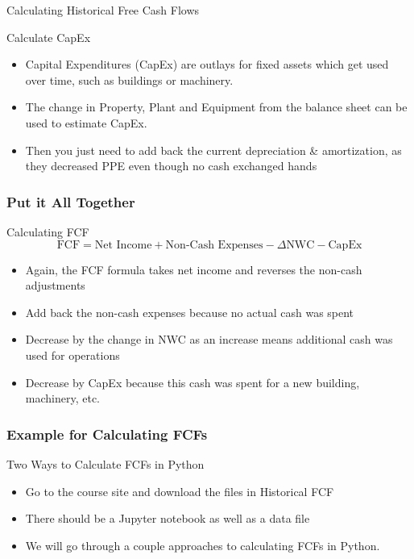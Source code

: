 \documentclass[handout, 11pt]{beamer}
\begin{document}
\begin{section}{Calculating Historical Free Cash Flows}
\begin{frame}
\begin{block}{Calculate CapEx}
\end{block}
\vfill
\begin{itemize}
\item Capital Expenditures (CapEx) are outlays for fixed assets which get used over time, such as buildings or machinery.
\vfill
\item The change in Property, Plant and Equipment from the balance sheet can be used to estimate CapEx.
\vfill
\item Then you just need to add back the current depreciation \& amortization, as they decreased PPE even though no cash exchanged hands
\end{itemize}
\end{frame}
\begin{frame}
\frametitle{Put it All Together}
\begin{block}{Calculating FCF}
\begin{equation}
	\text{FCF} = \text{Net Income} + \text{Non-Cash Expenses} - \Delta\text{NWC} - \text{CapEx}
\end{equation}
\end{block}
\vfill
\begin{itemize}
\item Again, the FCF formula takes net income and reverses the non-cash adjustments
\vfill
\item Add back the non-cash expenses because no actual cash was spent
\vfill
\item Decrease by the change in NWC as an increase means additional cash was used for operations
\vfill
\item Decrease by CapEx because this cash was spent for a new building, machinery, etc.
\end{itemize}
\end{frame}
\begin{frame}
\frametitle{Example for Calculating FCFs}
{
\begin{block}{Two Ways to Calculate FCFs in Python}
\begin{itemize}
\item Go to the course site and download the files in Historical FCF
\item There should be a Jupyter notebook as well as a data file
\item We will go through a couple approaches to calculating FCFs in Python.
\end{itemize}
\end{block}
}
\end{frame}

\end{section}
\end{document}
